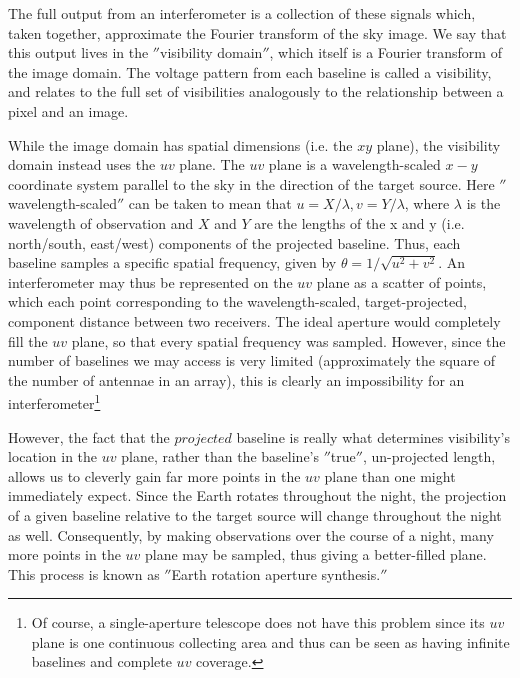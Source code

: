 


The full output from an interferometer is a collection of these signals which, taken together, approximate the Fourier transform of the sky image. We say that this output lives in the $''$visibility domain$''$, which itself is a Fourier transform of the image domain. The voltage pattern from each baseline is called a visibility, and relates to the full set of visibilities analogously to the relationship between a pixel and an image.


While the image domain has spatial dimensions (i.e. the $xy$ plane), the visibility domain instead uses the $uv$ plane. The $uv$ plane is a wavelength-scaled $x-y$ coordinate system parallel to the sky in the direction of the target source. Here $''$wavelength-scaled$''$ can be taken to mean that $u = X/\lambda, v = Y/\lambda$, where $\lambda$ is the wavelength of observation and $X$ and $Y$ are the lengths of the x and y (i.e. north/south, east/west) components of the projected baseline. Thus, each baseline samples a specific spatial frequency, given by $\theta = 1/\sqrt{u^2 + v^2}$. An interferometer may thus be represented on the $uv$ plane as a scatter of points, which each point corresponding to the wavelength-scaled, target-projected, component distance between two receivers. The ideal aperture would completely fill the $uv$ plane, so that every spatial frequency was sampled. However, since the number of baselines we may access is very limited (approximately the square of the number of antennae in an array), this is clearly an impossibility for an interferometer\footnote{Of course, a single-aperture telescope does not have this problem since its $uv$ plane is one continuous collecting area and thus can be seen as having infinite baselines and complete $uv$ coverage.}


However, the fact that the $projected$ baseline is really what determines visibility's location in the $uv$ plane, rather than the baseline's $''$true$''$, un-projected length, allows us to cleverly gain far more points in the $uv$ plane than one might immediately expect. Since the Earth rotates throughout the night, the projection of a given baseline relative to the target source will change throughout the night as well. Consequently, by making observations over the course of a night, many more points in the $uv$ plane may be sampled, thus giving a better-filled plane. This process is known as $''$Earth rotation aperture synthesis.$''$

